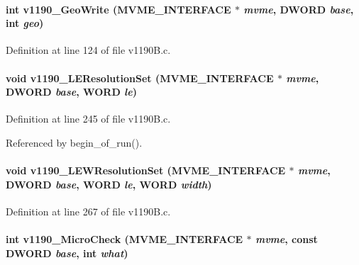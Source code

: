 \paragraph[{v1190\_\-GeoWrite}]{\setlength{\rightskip}{0pt plus 5cm}int v1190\_\-GeoWrite ({\bf MVME\_\-INTERFACE} $\ast$ {\em mvme}, \/  {\bf DWORD} {\em base}, \/  int {\em geo})}\hfill\label{v1190B_8h_a0ef526a3b6aa5b2bfa7b71712fcbd538}


Definition at line 124 of file v1190B.c.
\paragraph[{v1190\_\-LEResolutionSet}]{\setlength{\rightskip}{0pt plus 5cm}void v1190\_\-LEResolutionSet ({\bf MVME\_\-INTERFACE} $\ast$ {\em mvme}, \/  {\bf DWORD} {\em base}, \/  {\bf WORD} {\em le})}\hfill\label{v1190B_8h_a1d56cae6f08c550adf87b649c548e5aa}


Definition at line 245 of file v1190B.c.

Referenced by begin\_\-of\_\-run().
\paragraph[{v1190\_\-LEWResolutionSet}]{\setlength{\rightskip}{0pt plus 5cm}void v1190\_\-LEWResolutionSet ({\bf MVME\_\-INTERFACE} $\ast$ {\em mvme}, \/  {\bf DWORD} {\em base}, \/  {\bf WORD} {\em le}, \/  {\bf WORD} {\em width})}\hfill\label{v1190B_8h_ac02d820365ff4ea1705e56198d6a04fb}


Definition at line 267 of file v1190B.c.
\paragraph[{v1190\_\-MicroCheck}]{\setlength{\rightskip}{0pt plus 5cm}int v1190\_\-MicroCheck ({\bf MVME\_\-INTERFACE} $\ast$ {\em mvme}, \/  const {\bf DWORD} {\em base}, \/  int {\em what})}\hfill\label{v1190B_8h_ac127b5bd324832b1732ea8ddfc173adb}
